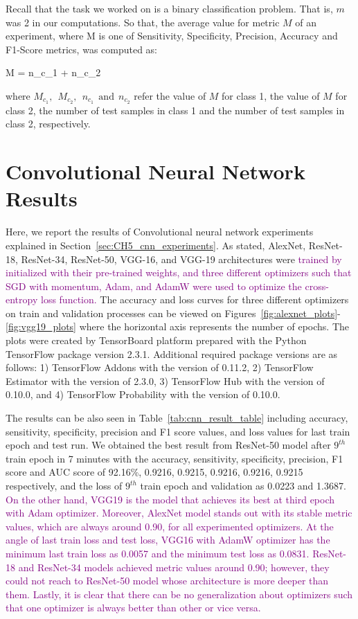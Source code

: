 Recall that the task we worked on is a binary classification problem. That is, $m$ was 2 in our computations. So that, the average value for metric $M$ of an experiment, where M is one of Sensitivity, Specificity, Precision, Accuracy and F1-Score metrics, was computed as:

\be
\label{eq:weighted_avg_binary_class_metric}
M =  {n_{c_{1}} + n_{c_{2}}} \:\: \raisepunct{,}
\ee

where $M_{c_{1}},\:\:M_{c_{2}},\:\:n_{c_{1}}\:\:\text{and}\:\:n_{c_{2}}$ refer the value of $M$ for class 1, the value of $M$ for class 2, the number of test samples in class 1 and the number of test samples in class 2, respectively.

\section{Convolutional Neural Network Results}

Here, we report the results of Convolutional neural network experiments explained in Section~\ref{sec:CH5_cnn_experiments}. As stated, AlexNet, ResNet-18, ResNet-34, ResNet-50, VGG-16, and VGG-19 architectures were \textcolor{purple}{trained by initialized with their pre-trained weights, and three different optimizers such that SGD with momentum, Adam, and AdamW were used to optimize the cross-entropy loss function.} The accuracy and loss curves for three different optimizers on train and validation processes can be viewed on Figures~\ref{fig:alexnet_plots}-\ref{fig:vgg19_plots} where the horizontal axis represents the number of epochs. The plots were created by TensorBoard platform prepared with the Python TensorFlow package version 2.3.1. Additional required package versions are as follows: 1) TensorFlow Addons with the version of 0.11.2, 2) TensorFlow Estimator with the version of 2.3.0, 3) TensorFlow Hub with the version of 0.10.0, and 4) TensorFlow Probability with the version of 0.10.0.

The results can be also seen in Table~\ref{tab:cnn_result_table} including accuracy, sensitivity, specificity, precision and F1 score values, and loss values for last train epoch and test run. We obtained the best result from ResNet-50 model after $9^{th}$ train epoch in 7 minutes with the accuracy, sensitivity, specificity, precision, F1 score and AUC score of 92.16\%, 0.9216, 0.9215, 0.9216, 0.9216, 0.9215 respectively, and the loss of $9^{th}$ train epoch and validation as 0.0223 and 1.3687. \textcolor{purple}{On the other hand, VGG19 is the model that achieves its best at third epoch with Adam optimizer. Moreover, AlexNet model stands out with its stable metric values, which are always around 0.90, for all experimented optimizers. At the angle of last train loss and test loss, VGG16 with AdamW optimizer has the minimum last train loss as 0.0057 and the minimum test loss as 0.0831. ResNet-18 and ResNet-34 models achieved metric values around 0.90; however, they could not reach to ResNet-50 model whose architecture is more deeper than them. Lastly, it is clear that there can be no generalization about optimizers such that one optimizer is always better than other or vice versa.}
 
